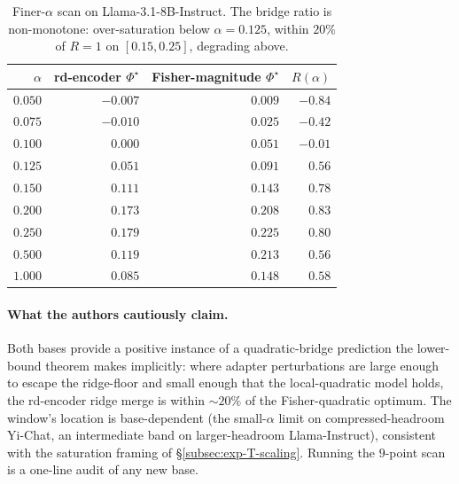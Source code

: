 \begin{table}[h]
\centering
\caption{Finer-$\alpha$ scan on Llama-3.1-8B-Instruct. The bridge
ratio is non-monotone: over-saturation below $\alpha = 0.125$, within
$20\%$ of $R = 1$ on $[0.15, 0.25]$, degrading above.}
\label{tab:e11b-llama-finer}
\begin{tabular}{rrrr}
\hline
$\alpha$ & rd-encoder $\Phi^\star$ & Fisher-magnitude $\Phi^\star$ & $R(\alpha)$ \\
\hline
$0.050$ & $-0.007$ & $\phantom{-}0.009$ & $-0.84$ \\
$0.075$ & $-0.010$ & $\phantom{-}0.025$ & $-0.42$ \\
$0.100$ & $\phantom{-}0.000$ & $\phantom{-}0.051$ & $-0.01$ \\
$0.125$ & $\phantom{-}0.051$ & $\phantom{-}0.091$ & $\phantom{-}0.56$ \\
$0.150$ & $\phantom{-}0.111$ & $\phantom{-}0.143$ & $\phantom{-}0.78$ \\
$\mathbf{0.200}$ & $\mathbf{0.173}$ & $\mathbf{0.208}$ & $\mathbf{0.83}$ \\
$0.250$ & $\phantom{-}0.179$ & $\phantom{-}0.225$ & $\phantom{-}0.80$ \\
$0.500$ & $\phantom{-}0.119$ & $\phantom{-}0.213$ & $\phantom{-}0.56$ \\
$1.000$ & $\phantom{-}0.085$ & $\phantom{-}0.148$ & $\phantom{-}0.58$ \\
\hline
\end{tabular}
\end{table}

\paragraph{What the authors cautiously claim.} Both bases provide a positive
instance of a quadratic-bridge prediction the lower-bound theorem makes
implicitly: where adapter perturbations are large enough to escape the
ridge-floor and small enough that the local-quadratic model holds, the
rd-encoder ridge merge is within $\sim 20\%$ of the Fisher-quadratic
optimum. The window's location is base-dependent (the small-$\alpha$
limit on compressed-headroom Yi-Chat, an intermediate band on
larger-headroom Llama-Instruct), consistent with the saturation
framing of \S\ref{subsec:exp-T-scaling}. Running the $9$-point scan is
a one-line audit of any new base.
